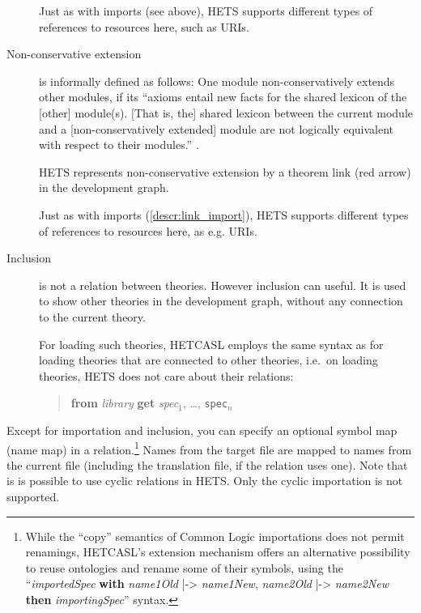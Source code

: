 \documentclass{article}
\newcommand{\normalTEXTSC}[2]{{#1\scriptsize#2}}
\newcommand     {\Hets}{\normalTEXTSC{H}{ETS}\xspace}
\newcommand{\HetCASL}{\normalTEXTSC{H}{ET}\normalTEXTSC{C}{ASL}\xspace}
\begin{document}
\begin{description}
  Just as with imports (see above), \Hets supports different types 
  of references to resources here, such as URIs.
  
\item[Non-conservative extension] is informally defined as follows:  One module non-conservatively extends other modules, if its “axioms entail new facts for the shared lexicon of the [other] module(s). [That is, the] shared lexicon between the current module and a [non-conservatively extended] module are not logically equivalent with respect to their modules.” \cite{Colore-metadata}.

  \Hets represents non-conservative extension by a theorem link (red arrow) in the development graph.
  
  Just as with imports (\ref{descr:link_import}), \Hets supports different types 
  of references to resources here, as e.g. URIs.
  

\item[Inclusion]
  is not a relation between theories. However inclusion can useful. It is used 
  to show other theories in the development graph, without any connection 
  to the current theory.
  
  For loading such theories, \HetCASL employs the same syntax as for loading theories that are connected to other theories, i.e.\ on loading theories, \Hets does not care about their relations:
\begin{quote}
\textbf{from} \textit{library} \textbf{get} \textit{spec$_1$}, \dots, \texttt{spec$_n$}
\end{quote}
\end{description}

Except for importation and inclusion, you can specify an optional symbol map 
(name map) in a relation.\footnote{While the ``copy'' semantics of Common Logic importations does not permit renamings, \HetCASL's extension mechanism offers an alternative possibility to reuse ontologies and rename some of their symbols, using the ``\textit{importedSpec} \textbf{with} \textit{name1Old} |-> \textit{name1New}, \textit{name2Old} |-> \textit{name2New} \textbf{then} \textit{importingSpec}'' syntax.}
 Names from the target file are mapped to names from the current 
file (including the translation file, if the relation uses one).  Note that is is possible to use cyclic relations in \Hets. Only the cyclic 
importation is not supported.
\end{document}

